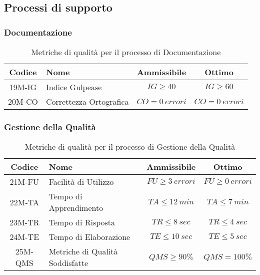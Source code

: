 \newpage
\subsection{Processi di supporto}
\subsubsection{Documentazione}
\begin{table}[h!]
	\centering
	\begin{tabular}{ | c | l | c | c | }
		\hline
		Codice   & Nome                    & Ammissibile        & Ottimo             \\
		\hline
		19M-IG   & Indice Gulpease         & $IG \geq 40$       & $IG \geq 60$       \\
		20M-CO   & Correttezza Ortografica & $CO = 0\ errori$   & $CO = 0\ errori$   \\
		\hline
	\end{tabular}
	\caption{Metriche di qualità per il processo di Documentazione}
\end{table}

\subsubsection{Gestione della Qualità}
\begin{table}[h!]
	\centering
	\begin{tabular}{ | c | l | c | c | }
		\hline
		Codice   & Nome                           & Ammissibile         & Ottimo              \\
		\hline
		21M-FU  & Facilità di Utilizzo            & $FU \geq 3\ errori$ & $FU \geq 0\ errori$ \\
		22M-TA  & Tempo di Apprendimento	      & $TA \leq 12\ min$   & $TA \leq 7\ min$    \\
		23M-TR  & Tempo di Risposta		          & $TR \leq 8\ sec$    & $TR \leq 4\ sec$    \\
		24M-TE  & Tempo di Elaborazione		      & $TE \leq 10\ sec$   & $TE \leq 5\ sec$    \\
		25M-QMS & Metriche di Qualità Soddisfatte & $QMS \geq 90\%$     & $QMS = 100\%$       \\
		\hline
	\end{tabular}
	\caption{Metriche di qualità per il processo di Gestione della Qualità}
\end{table}

